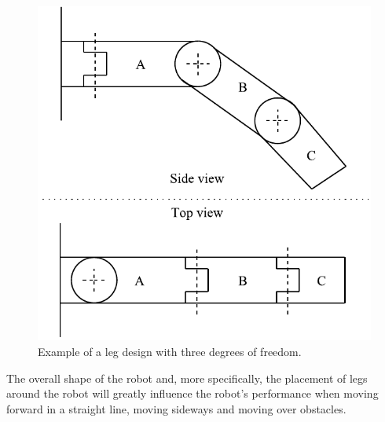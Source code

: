 \FloatBarrier
\begin{figure}[h]
\centering
\includegraphics[scale = 1]{pics/3DOF.pdf}
\caption{Example of a leg design with three degrees of freedom.}
\label{fig:3DOF}
\end{figure}
\FloatBarrier
The overall shape of the robot and, more specifically, the placement of legs around the robot will greatly influence the robot's performance when moving forward in a straight line, moving sideways and moving over obstacles.

